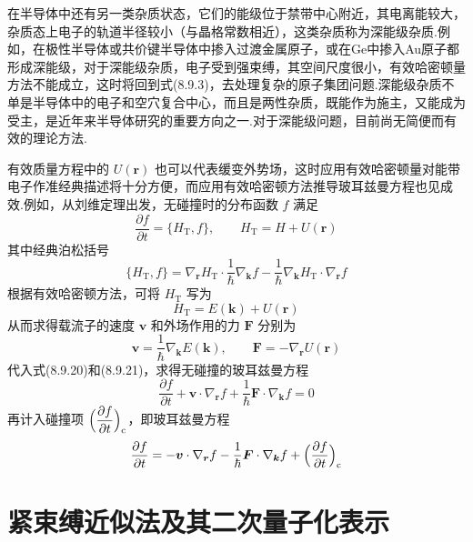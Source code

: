 在半导体中还有另一类杂质状态，它们的能级位于禁带中心附近，其电离能较大，杂质态上电子的轨道半径较小（与晶格常数相近），这类杂质称为深能级杂质.例如，在极性半导体或共价键半导体中掺入过渡金属原子，或在Ge中掺入Au原子都形成深能级，对于深能级杂质，电子受到强束缚，其空间尺度很小，有效哈密顿量方法不能成立，这时将回到式(8.9.3)，去处理复杂的原子集团问题.深能级杂质不单是半导体中的电子和空穴复合中心，而且是两性杂质，既能作为施主，又能成为受主，是近年来半导体研究的重要方向之一.对于深能级问题，目前尚无简便而有效的理论方法.

有效质量方程中的 $U(\boldsymbol{r})$ 也可以代表缓变外势场，这时应用有效哈密顿量对能带电子作准经典描述将十分方便，而应用有效哈密顿方法推导玻耳兹曼方程也见成效.例如，从刘维定理出发，无碰撞时的分布函数 $f$ 满足
\begin{equation}
  \frac{\partial f}{\partial t}=\{H_{\mathrm{T}},f\},\qquad H_{\mathrm{T}}=H+U(\boldsymbol{r})
\end{equation}
其中经典泊松括号
\begin{equation}
  \{H_{\mathrm{T}},f\}=\nabla_{\boldsymbol{r}}H_{\mathrm{T}}\cdot\frac{1}{\hbar}\nabla_{\boldsymbol{k}}f
  -\frac{1}{\hbar}\nabla_{\boldsymbol{k}}H_{\mathrm{T}}\cdot\nabla_{\boldsymbol{r}}f
\end{equation}
根据有效哈密顿方法，可将 $H_{\mathrm{T}}$ 写为
\begin{equation}
  H_{\mathrm{T}}=E(\boldsymbol{k})+U(\boldsymbol{r})
\end{equation}
从而求得载流子的速度 $\boldsymbol{v}$ 和外场作用的力 $\boldsymbol{F}$ 分别为
\begin{equation}
  \boldsymbol{v}=\frac{1}{\hbar}\nabla_{\boldsymbol{k}}E(\boldsymbol{k}),\qquad
  \boldsymbol{F}=-\nabla_{\boldsymbol{r}}U(\boldsymbol{r})
\end{equation}
代入式(8.9.20)和(8.9.21)，求得无碰撞的玻耳兹曼方程
\begin{equation}
  \frac{\partial f}{\partial t}+\boldsymbol{v}\cdot\nabla_{\boldsymbol{r}}f+\frac{1}{\hbar}\boldsymbol{F}\cdot\nabla_{\boldsymbol{k}}f=0
\end{equation}
再计入碰撞项 $\Bigl(\dfrac{\partial f}{\partial t}\Bigr)_{\mathrm{c}}$，即玻耳兹曼方程
\begin{equation}
  \frac{\partial f}{\partial t}=-\boldsymbol{v}\cdot\nabla_{\boldsymbol{r}}f
  -\frac{1}{\hbar}\boldsymbol{F}\cdot\nabla_{\boldsymbol{k}}f
  +\Bigl(\frac{\partial f}{\partial t}\Bigr)_{\mathrm{c}}
\end{equation}
\section{紧束缚近似法及其二次量子化表示}

